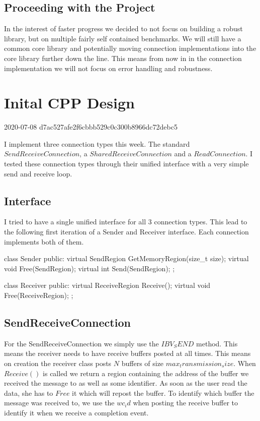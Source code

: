 \documentclass[a4paper,twoside]{article} %
\newcommand{\entry}[3]{\section*{#3}#1  #2}
\begin{document}
\subsection*{Proceeding with the Project}

In the interest of faster progress we decided to not focus on building a robust library, but on multiple fairly self contained
benchmarks. We will still have a common core library and potentially moving connection implementations into the core library
further down the line. This means from now in in the connection implementation we will not focus on error handling and 
robustness.


\entry{2020-07-08}{d7ac527afe2f6cbbb529c0c300b8966dc72debc5}{Inital CPP Design}

I implement three connection types this week. The standard $SendReceiveConnection$, a $SharedReceiveConnection$ and a 
$ReadConnection$. I tested these connection types through their unified interface with a very simple send and receive loop.

\subsection*{Interface}

I tried to have a single unified interface for all 3 connection types. This lead to the following first iteration of 
a Sender and Receiver interface. Each connection implements both of them.


\begin{listing}[H]
\begin{ccode}
class Sender {
  public:
    virtual SendRegion GetMemoryRegion(size_t size);
    virtual void Free(SendRegion);
    virtual int Send(SendRegion);
};

class Receiver {
  public:
    virtual ReceiveRegion Receive();
    virtual void Free(ReceiveRegion);
};


\end{ccode}
\label{lst:fstInterface}
\end{listing}

\subsection*{SendReceiveConnection}

For the SendReceiveConnection we simply use the $IBV_SEND$ method. This means the receiver needs to have receive buffers
posted at all times. This means on creation the receiver class posts $N$ buffers of size $max_transmission_size$. When 
$Receive()$ is called we return a region containing the address of the buffer we received the message to as well as some
identifier. As soon as the user read the data, she has to $Free$ it which will repost the buffer. To identify which buffer
the message was received to, we use the $wc_id$ when posting the receive buffer to identify it when we receive a completion
event.
\end{document}
